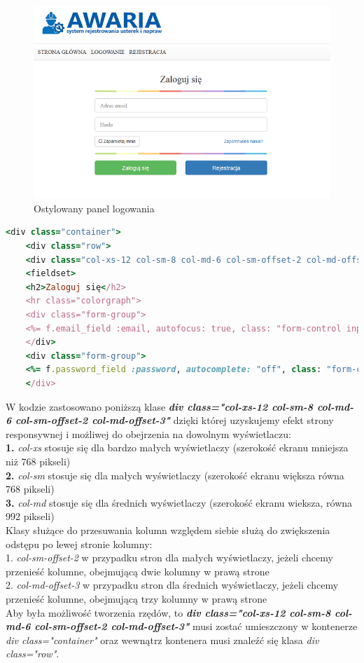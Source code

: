 \documentclass[openright]{xmgr}
\begin{document}
	\begin{figure}[!tbh]
		\centering
		\includegraphics[width=\linewidth]{image/panelhtml}
		\caption{Ostylowany panel logowania}
	\end{figure}
\newpage
	\begin{lstlisting}[language=Ruby,lineskip={-1pt},caption= Kod obudowany kodem HTML]
	<div class="container">
	<div class="row">
	<div class="col-xs-12 col-sm-8 col-md-6 col-sm-offset-2 col-md-offset-3">
	<fieldset>
	<h2>Zaloguj się</h2>
	<hr class="colorgraph">
	<div class="form-group">
	<%= f.email_field :email, autofocus: true, class: "form-control input-lg", placeholder: "Adres email" %>
	</div>
	<div class="form-group">
	<%= f.password_field :password, autocomplete: "off", class: "form-control input-lg", placeholder: "Hasło"  %>
	</div>
	\end{lstlisting}

W kodzie zastosowano poniższą klase \textbf{\textit{div class="col-xs-12 col-sm-8 col-md-6 col-sm-offset-2 col-md-offset-3"}} dzięki której uzyskujemy efekt strony responsywnej i możliwej do obejrzenia na dowolnym wyświetlaczu:\\
\textbf{1.} \textit{col-xs} stosuje się dla bardzo małych wyświetlaczy (szerokość ekranu mniejsza niż 768 pikseli)\\
\textbf{2.} \textit{col-sm} stosuje się dla małych wyświetlaczy (szerokość ekranu większa równa 768 pikseli)\\
\textbf{3.} \textit{col-md} stosuje się dla średnich wyświetlaczy (szerokość ekranu wieksza, równa 992 pikseli)\\

Klasy służące do przesuwania kolumn względem siebie służą do zwiększenia odstępu po lewej stronie kolumny: \\
1. \textit{col-sm-offset-2} w przypadku stron dla małych wyświetlaczy, jeżeli chcemy przenieść kolumne, obejmującą dwie kolumny w prawą strone\\
2. \textit{col-md-offset-3} w przypadku stron dla średnich wyświetlaczy, jeżeli chcemy przenieść kolumne, obejmującą trzy kolumny w prawą strone\\
\newpage
Aby była możliwość tworzenia rzędów, to \textbf{\textit{div class="col-xs-12 col-sm-8 col-md-6 col-sm-offset-2 col-md-offset-3"}} musi zostać umieszczony w kontenerze \textit{div class="container"} oraz wewnątrz kontenera musi znaleźć się klasa \textit{div class="row"}.\\
\end{document}
